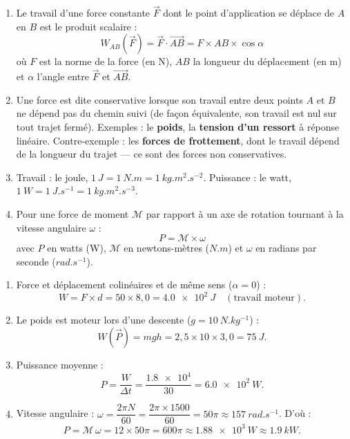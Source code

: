 \documentclass[11pt]{article}
\newcommand{\cle}[1]{{\popxbold\color{popdark}#1}}
\begin{document}
\begin{corrige}
\begin{enumerate}
\item Le \cle{travail} d'une force constante $\vec{F}$ dont le point d'application se déplace de $A$ en $B$ est le produit scalaire :
\[ W_{AB}(\vec{F}) = \vec{F}\cdot\overrightarrow{AB} = F\times AB\times\cos\alpha \]
où $F$ est la norme de la force (en N), $AB$ la longueur du déplacement (en m) et $\alpha$ l'angle entre $\vec{F}$ et $\overrightarrow{AB}$.
\item Une force est dite \cle{conservative} lorsque son travail entre deux points $A$ et $B$ ne dépend pas du chemin suivi (de façon équivalente, son travail est nul sur tout trajet fermé). Exemples : le \textbf{poids}, la \textbf{tension d'un ressort} à réponse linéaire. Contre-exemple : les \textbf{forces de frottement}, dont le travail dépend de la longueur du trajet — ce sont des forces non conservatives.
\item Travail : le joule, $\SI{1}{J} = \SI{1}{N.m} = \SI{1}{kg.m^2.s^{-2}}$. Puissance : le watt, $\SI{1}{W} = \SI{1}{J.s^{-1}} = \SI{1}{kg.m^2.s^{-3}}$.
\item Pour une force de moment $\mathcal{M}$ par rapport à un axe de rotation tournant à la vitesse angulaire $\omega$ :
\[ P = \mathcal{M}\times\omega \]
avec $P$ en watts (W), $\mathcal{M}$ en newtons-mètres ($\si{N.m}$) et $\omega$ en radians par seconde ($\si{rad.s^{-1}}$).
\end{enumerate}
\end{corrige}

\begin{corrige}
\begin{enumerate}
\item Force et déplacement colinéaires et de même sens ($\alpha = 0$) :
\[ W = F\times d = 50\times 8,0 = \SI{4,0e2}{J} \quad (\text{travail moteur}). \]
\item Le poids est moteur lors d'une descente ($g = \SI{10}{N.kg^{-1}}$) :
\[ W(\vec{P}) = mgh = 2,5\times 10\times 3,0 = \SI{75}{J}. \]
\item Puissance moyenne :
\[ P = \dfrac{W}{\Delta t} = \dfrac{\num{1,8e4}}{30} = \SI{6,0e2}{W}. \]
\item Vitesse angulaire : $\omega = \dfrac{2\pi N}{60} = \dfrac{2\pi\times 1500}{60} = 50\pi \approx \SI{157}{rad.s^{-1}}$. D'où :
\[ P = \mathcal{M}\,\omega = 12\times 50\pi = 600\pi \approx \SI{1,88e3}{W} \approx \SI{1,9}{kW}. \]
\end{enumerate}
\end{corrige}
\end{document}
